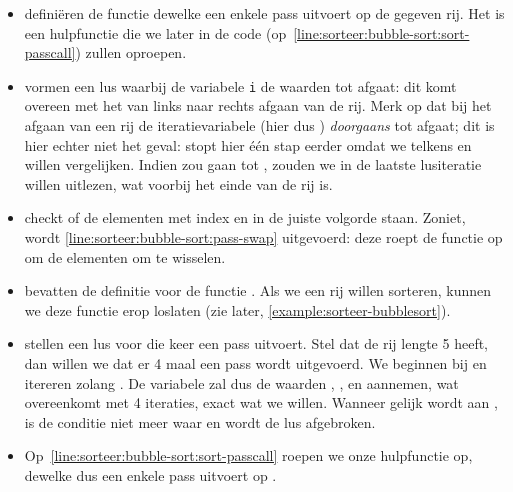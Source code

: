 \begin{itemize}
  \item {} defini\"eren
        de functie  dewelke een enkele pass uitvoert op de gegeven rij.
        Het is een hulpfunctie die we later in de code (op~\cref{line:sorteer:bubble-sort:sort-passcall})
        zullen oproepen.
  \item {}
        vormen een lus waarbij de variabele \lstinline{i} de waarden  tot 
        afgaat: dit komt overeen met het van links naar rechts afgaan van de rij.
        Merk op dat bij het afgaan van een rij de iteratievariabele (hier dus )
        \emph{doorgaans}  tot  afgaat; dit is hier echter
        niet het geval:  stopt hier \'e\'en stap eerder omdat
        we telkens  en  willen vergelijken.
        Indien  zou gaan tot , zouden
        we in de laatste lusiteratie  willen uitlezen, wat voorbij het
        einde van de rij is.
  \item {} checkt of de elementen
        met index  en  in de juiste volgorde staan.
        Zoniet, wordt \cref{line:sorteer:bubble-sort:pass-swap} uitgevoerd:
        deze roept de functie  op om de elementen
        om te wisselen.
  \item {}
        bevatten de definitie voor de functie . Als we een rij willen
        sorteren, kunnen we deze functie erop loslaten (zie later, \cref{example:sorteer-bubblesort}).
  \item {}
        stellen een lus voor die  keer een pass uitvoert.
        Stel dat de rij lengte 5 heeft, dan willen we dat er 4 maal een pass wordt uitgevoerd.
        We beginnen bij  en itereren zolang .
        De variabele  zal dus de waarden , ,
         en  aannemen, wat overeenkomt met 4 iteraties, exact wat we willen.
        Wanneer  gelijk wordt aan , is de conditie
         niet meer waar en wordt de lus afgebroken.
  \item Op~\cref{line:sorteer:bubble-sort:sort-passcall} roepen we onze hulpfunctie
         op, dewelke dus een enkele pass uitvoert op .
\end{itemize}

